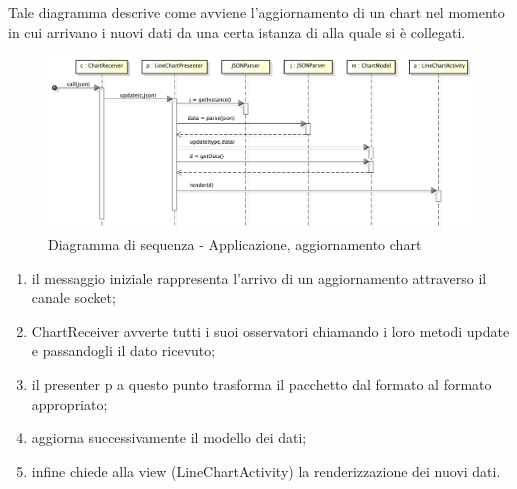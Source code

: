             Tale diagramma descrive come avviene l'aggiornamento di un chart nel momento in cui arrivano i nuovi dati da una certa istanza di  alla quale si è collegati.
            \begin{figure}[H]
                \centering
                \includegraphics[scale=0.3]{DefinizioneDiProdotto/Pics/ApplicazioneAggiornamentoChart}
                \caption{Diagramma di sequenza - Applicazione, aggiornamento chart}
            \end{figure}
            \begin{enumerate}
                \item il messaggio iniziale rappresenta l'arrivo di un aggiornamento attraverso il canale socket;
                \item ChartReceiver avverte tutti i suoi osservatori chiamando i loro metodi update e passandogli il dato ricevuto;
                \item il presenter p a questo punto trasforma il pacchetto dal formato  al formato appropriato;
                \item aggiorna successivamente il modello dei dati;
                \item infine chiede alla view (LineChartActivity) la renderizzazione dei nuovi dati.
            \end{enumerate}
